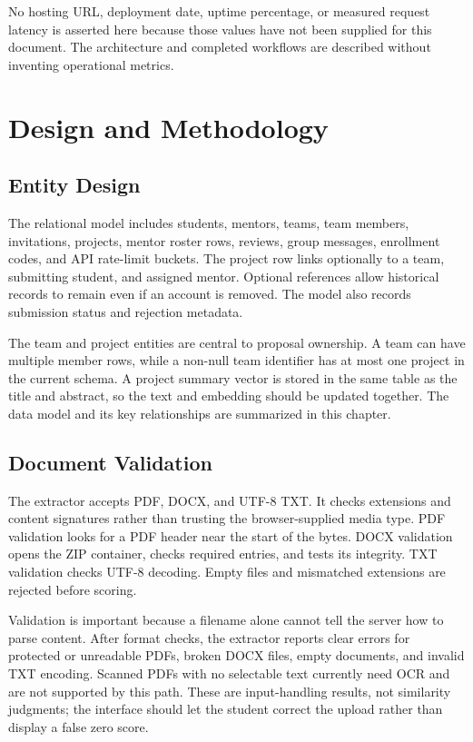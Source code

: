 \documentclass[12pt,a4paper]{report}
\begin{document}
No hosting URL, deployment date, uptime percentage, or measured request latency is asserted here because those values have not been supplied for this document. The architecture and completed workflows are described without inventing operational metrics.

\chapter{Design and Methodology}
\section{Entity Design}
The relational model includes students, mentors, teams, team members, invitations, projects, mentor roster rows, reviews, group messages, enrollment codes, and API rate-limit buckets. The project row links optionally to a team, submitting student, and assigned mentor. Optional references allow historical records to remain even if an account is removed. The model also records submission status and rejection metadata.

The team and project entities are central to proposal ownership. A team can have multiple member rows, while a non-null team identifier has at most one project in the current schema. A project summary vector is stored in the same table as the title and abstract, so the text and embedding should be updated together. The data model and its key relationships are summarized in this chapter.


\section{Document Validation}
The extractor accepts PDF, DOCX, and UTF-8 TXT. It checks extensions and content signatures rather than trusting the browser-supplied media type. PDF validation looks for a PDF header near the start of the bytes. DOCX validation opens the ZIP container, checks required entries, and tests its integrity. TXT validation checks UTF-8 decoding. Empty files and mismatched extensions are rejected before scoring.

Validation is important because a filename alone cannot tell the server how to parse content. After format checks, the extractor reports clear errors for protected or unreadable PDFs, broken DOCX files, empty documents, and invalid TXT encoding. Scanned PDFs with no selectable text currently need OCR and are not supported by this path. These are input-handling results, not similarity judgments; the interface should let the student correct the upload rather than display a false zero score.
\end{document}
